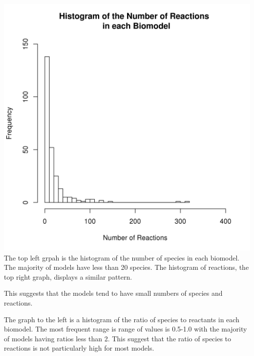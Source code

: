 \documentclass[portrait,a0paper,fontscale=0.35]{baposter}
\begin{document}
\begin{poster}
{\begin{multicols}{2}
 \includegraphics[trim= 1.5mm 5mm 5mm 5mm, clip, scale=0.4]{Poster-images/ReactionsHistogram.png} 
 The top left grpah is the histogram of the number of species in each biomodel. The majority of models have less than 20 species. The histogram of reactions, the top right graph, displays a similar pattern.
 
 This suggests that the models tend to have small numbers of species and reactions.
 
 The graph to the left is a histogram of the ratio of species to reactants in each biomodel. The most frequent range is range of values is 0.5-1.0 with the majority of models having ratios less than 2. This suggest that the ratio of species to reactions is not particularly high for most models.
 \end{multicols}
 }
 
 
 
 

\end{poster}
\end{document}
